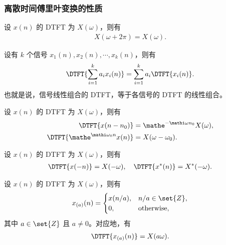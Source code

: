 \subsubsection{离散时间傅里叶变换的性质}

\begin{property}
    设 $x(n)$ 的 DTFT 为 $X(\omega)$，则有
    \begin{align*}
        X(\omega + 2\pi) = X(\omega).
    \end{align*}
\end{property}

\begin{property}
    设有 $k$ 个信号 $x_1(n), x_2(n), \cdots, x_k(n)$，则有
    \begin{align*}
        \DTFT{\sum_{i = 1}^{k}a_i x_i(n)} = \sum_{i = 1}^{k}a_i \DTFT{x_i(n)}.
    \end{align*}
    也就是说，信号线性组合的 DTFT，等于各信号的 DTFT 的线性组合。
\end{property}

\begin{property}
    设 $x(n)$ 的 DTFT 为 $X(\omega)$，则有
    \begin{align*}
        \DTFT{x(n - n_0)} & = \mathe^{-\mathi\omega n_0}X(\omega), \\
        \DTFT{\mathe^{\mathi\omega_0 n}x(n)} & = X(\omega - \omega_0).
    \end{align*}
\end{property}

\begin{property}
    设 $x(n)$ 的 DTFT 为 $X(\omega)$，则有
    \begin{align*}
        \DTFT{x(-n)} = X(-\omega), \quad \DTFT{x^*(n)} = X^*(-\omega).
    \end{align*}
\end{property}

\begin{property}
    \label{property:DTFT_time_expand}
    设 $x(n)$ 的 DTFT 为 $X(\omega)$，则有
    \begin{align*}
        x_{(a)}(n) = \begin{cases}
            x(n/a), & n/a \in \set{Z}, \\
            0, & \text{otherwise},
        \end{cases}
    \end{align*}
    其中 $a \in \set{Z}$ 且 $a \neq 0$。对应地，有
    \begin{align*}
        \DTFT{x_{(a)}(n)} = X(a\omega).
    \end{align*}
\end{property}

